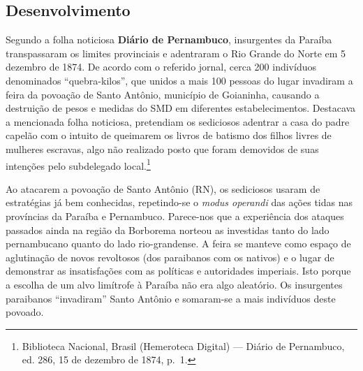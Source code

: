 \begin{refsection}
\section{Desenvolvimento}

Segundo a folha noticiosa \textbf{Diário de Pernambuco}, insurgentes da Paraíba transpassaram os limites provinciais e adentraram o Rio Grande do Norte em 5 dezembro de 1874. De acordo com o referido jornal, cerca 200 indivíduos denominados “quebra-kilos”, que unidos a mais 100 pessoas do lugar invadiram a feira da povoação de Santo Antônio, município de Goianinha, causando a destruição de pesos e medidas do SMD em diferentes estabelecimentos. Destacava a mencionada folha noticiosa, pretendiam os sediciosos adentrar a casa do padre capelão com o intuito de queimarem os livros de batismo dos filhos livres de mulheres escravas, algo não realizado posto que foram demovidos de suas intenções pelo subdelegado local.\footnote{Biblioteca Nacional, Brasil (Hemeroteca Digital) --- Diário de Pernambuco, ed. 286, 15 de dezembro de 1874, p.~1.}

Ao atacarem a povoação de Santo Antônio (RN), os sediciosos usaram de estratégias já bem conhecidas, repetindo-se o \textit{modus operandi} das ações tidas nas províncias da Paraíba e Pernambuco. Parece-nos que a experiência dos ataques passados ainda na região da Borborema norteou as investidas tanto do lado pernambucano quanto do lado rio-grandense. A feira se manteve como espaço de aglutinação de novos revoltosos (dos paraibanos com os nativos) e o lugar de demonstrar as insatisfações com as políticas e autoridades imperiais. Isto porque a escolha de um alvo limítrofe à Paraíba não era algo aleatório. Os insurgentes paraibanos “invadiram” Santo Antônio e somaram-se a mais indivíduos deste povoado.


\end{refsection}
